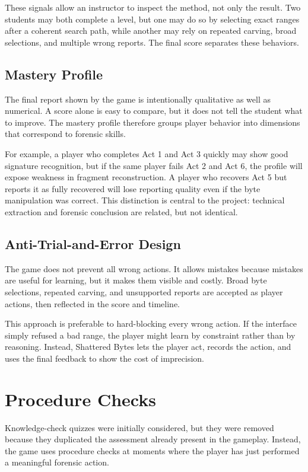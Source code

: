 \documentclass[11pt,a4paper]{article}
\newcommand{\projecttitle}{Shattered Bytes}
\begin{document}
These signals allow an instructor to inspect the method, not only the result. Two students may both complete a level, but one may do so by selecting exact ranges after a coherent search path, while another may rely on repeated carving, broad selections, and multiple wrong reports. The final score separates these behaviors.

\subsection{Mastery Profile}

The final report shown by the game is intentionally qualitative as well as numerical. A score alone is easy to compare, but it does not tell the student what to improve. The mastery profile therefore groups player behavior into dimensions that correspond to forensic skills.

For example, a player who completes Act 1 and Act 3 quickly may show good signature recognition, but if the same player fails Act 2 and Act 6, the profile will expose weakness in fragment reconstruction. A player who recovers Act 5 but reports it as fully recovered will lose reporting quality even if the byte manipulation was correct. This distinction is central to the project: technical extraction and forensic conclusion are related, but not identical.

\subsection{Anti-Trial-and-Error Design}

The game does not prevent all wrong actions. It allows mistakes because mistakes are useful for learning, but it makes them visible and costly. Broad byte selections, repeated carving, and unsupported reports are accepted as player actions, then reflected in the score and timeline.

This approach is preferable to hard-blocking every wrong action. If the interface simply refused a bad range, the player might learn by constraint rather than by reasoning. Instead, \projecttitle{} lets the player act, records the action, and uses the final feedback to show the cost of imprecision.

\section{Procedure Checks}

Knowledge-check quizzes were initially considered, but they were removed because they duplicated the assessment already present in the gameplay. Instead, the game uses procedure checks at moments where the player has just performed a meaningful forensic action.
\end{document}
